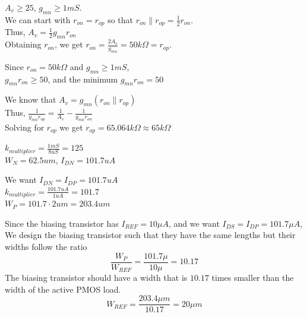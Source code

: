 \documentclass{article}
\begin{document}
\newpage 

\noindent $A_{v} \geq 25$, $g_{mn} \geq 1mS$.
\vspace{8pt}
\\
\noindent We can start with $r_{on} = r_{op}$ so that $r_{on} \| r_{op} = \frac{1}{2} r_{on}$.
\vspace{8pt}
\\ Thus, $A_{v} = \frac{1}{2} g_{mn} r_{on}$  
\vspace{8pt}
\\ Obtaining $r_{on}$, we get $r_{on} = \frac{2A_v}{g_{mn}} = 50k\Omega = r_{op}$. 

\vspace{20pt}
\noindent Since $r_{on} = 50k\Omega$ and $g_{mn} \geq 1mS$,
\vspace{8pt}
\\ $g_{mn}r_{on} \geq 50$, and the minimum $g_{mn}r_{on} = 50$

\vspace{20pt}
\noindent We know that $A_v = g_{mn}(r_{on}\|r_{op})$
\vspace{8pt}
\\ Thus, $\frac{1}{g_{mn}r_{op}} = \frac{1}{A_v} - \frac{1}{g_{mn}r_{on}}$
\vspace{4pt}
\\ Solving for $r_{op}$ we get $r_{op} = 65.064k\Omega \approx 65k\Omega$

\vspace{20pt}
\Large
\noindent $k_{multiplier} = \frac{1mS}{8uS} = 125$
\normalsize 
\vspace{8pt}
\\ $W_N = 62.5um$, $I_{DN} = 101.7uA$

\vspace{20pt}
\noindent 
We want $I_{DN} = I_{DP} = 101.7uA$
\vspace{8pt}
\Large
\\ $k_{multiplier} = \frac{101.7uA}{1uA} = 101.7$
\vspace{8pt}
\normalsize
\\$W_{P} = 101.7 \cdot 2um = 203.4um$


\vspace{20pt}
\noindent 
Since the biasing transistor has $I_{REF} = 10\mu A$, and we want $I_{DS} = I_{DP} = 101.7\mu A$,
\vspace{8pt}
\\ We design the biasing transistor such that they have the same lengths but their widths follow the 
ratio 
\large 
$$\frac{W_{P}}{W_{REF}} = \frac{101.7\mu}{10\mu} = 10.17$$ 
\normalsize
The biasing transistor should have a width that is $10.17$ times smaller than the width of the active
PMOS load.
\large
$$W_{REF} = \frac{203.4\mu m}{10.17} = 20\mu m$$
\end{document}
